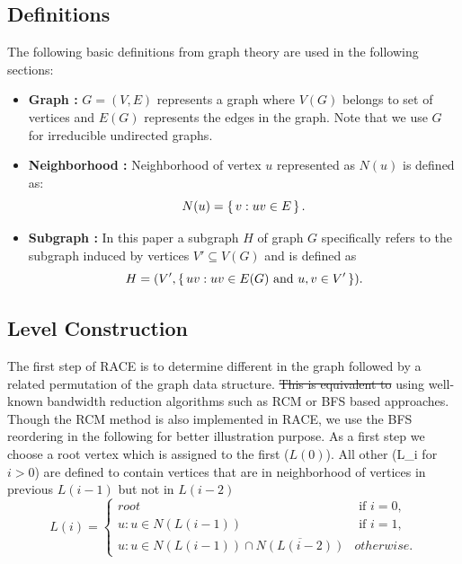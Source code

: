 \subsection*{Definitions}
The following basic definitions from graph theory are used in the following sections:
\begin{itemize}
	\item \textbf{Graph : } $G = (V,E)$ represents a graph where $V(G)$ belongs to set of vertices and $E(G)$ represents the edges in the graph. Note that we use $G$ for irreducible undirected graphs.
	\item \textbf{Neighborhood :} Neighborhood of vertex $u$ represented as $N(u)$ is defined as:
	\begin{equation*}
	  N(u) = \set{ v : uv \in E}.
	\end{equation*}
	\item \textbf{Subgraph :} In this paper a subgraph $H$ of graph $G$ specifically refers to the subgraph induced by vertices $V' \subseteq V(G)$ and is defined as
	\begin{equation*}
		H = (V', \set{ uv : uv \in E(G) \text{ and } u,v \in V'}).
	\end{equation*}
\end{itemize}

\subsection{Level Construction}\label{subsec:LEVEL_CONST}
The first step of \acrshort{RACE} is to determine different \textit{\levels} in the graph followed by a related permutation of the graph data structure. \sout{This is equivalent to}  using well-known bandwidth reduction algorithms such as \acrfull{RCM} or \acrfull{BFS} \cite{BFS} based approaches. Though the RCM method is also implemented in \acrshort{RACE}, we use the  \acrshort{BFS} reordering in the following for better illustration purpose.
As a first step we choose a root vertex which is assigned to the first \level ($L(0)$). All other \levels (\acrshort{L_i} for $i > 0$) are defined to  contain vertices that are in neighborhood of vertices in previous \level $L(i-1)$ but not in \level $L(i-2)$ \cite{BFS_level_def} \ie
\begin{equation}\label{eq:level}
L(i) = 
\begin{cases}
	 root & \text{ if } i = 0, \\
	 u : u \in N(L(i-1))  & \text{ if } i = 1, \\
	 u : u \in N(L(i-1)) \cap \overline{N(L(i-2))}  & otherwise.
\end{cases}   
\end{equation}

